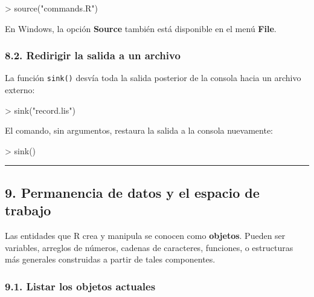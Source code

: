 \documentclass[
  jou,
  floatsintext,
  longtable,
  a4paper,
  nolmodern,
  notxfonts,
  notimes,
  12pt,
  colorlinks=true,linkcolor=blue,citecolor=blue,urlcolor=blue]{apa7}
\newenvironment{Shaded}{\begin{snugshade}}{\end{snugshade}}
\newcommand{\FunctionTok}[1]{\textcolor[rgb]{0.28,0.35,0.67}{#1}}
\newcommand{\NormalTok}[1]{\textcolor[rgb]{0.00,0.23,0.31}{#1}}
\newcommand{\SpecialCharTok}[1]{\textcolor[rgb]{0.37,0.37,0.37}{#1}}
\newcommand{\StringTok}[1]{\textcolor[rgb]{0.13,0.47,0.30}{#1}}
\begin{document}
\begin{Shaded}
\begin{Highlighting}[]
\SpecialCharTok{\textgreater{}} \FunctionTok{source}\NormalTok{(}\StringTok{"commands.R"}\NormalTok{)}
\end{Highlighting}
\end{Shaded}

En Windows, la opción \textbf{Source} también está disponible en el menú
\textbf{File}.

\subsubsection{8.2. Redirigir la salida a un
archivo}\label{redirigir-la-salida-a-un-archivo}

La función \texttt{sink()} desvía toda la salida posterior de la consola
hacia un archivo externo:

\begin{Shaded}
\begin{Highlighting}[]
\SpecialCharTok{\textgreater{}} \FunctionTok{sink}\NormalTok{(}\StringTok{"record.lis"}\NormalTok{)}
\end{Highlighting}
\end{Shaded}

El comando, sin argumentos, restaura la salida a la consola nuevamente:

\begin{Shaded}
\begin{Highlighting}[]
\SpecialCharTok{\textgreater{}} \FunctionTok{sink}\NormalTok{()}
\end{Highlighting}
\end{Shaded}

\begin{center}\rule{0.5\linewidth}{0.5pt}\end{center}

\subsection{9. Permanencia de datos y el espacio de
trabajo}\label{permanencia-de-datos-y-el-espacio-de-trabajo}

Las entidades que R crea y manipula se conocen como \textbf{objetos}.
Pueden ser variables, arreglos de números, cadenas de caracteres,
funciones, o estructuras más generales construidas a partir de tales
componentes.

\subsubsection{9.1. Listar los objetos
actuales}\label{listar-los-objetos-actuales}
\end{document}
